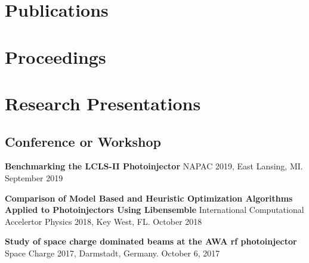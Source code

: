 \documentclass[11pt,a4paper,sans]{moderncv}        %
\begin{document}
\newpage
\section{Publications}
%






\section{Proceedings}


\section{Research Presentations}
\subsection{Conference or Workshop} %
\textbf{Benchmarking the LCLS-II Photoinjector}\newline
NAPAC 2019, East Lansing, MI. September 2019
\vspace{0.3em}

\textbf{Comparison of Model Based and Heuristic Optimization Algorithms \newline
	Applied to Photoinjectors Using Libensemble}\newline
International Computational Accelertor Physics 2018, Key West, FL. October 2018
\vspace{0.3em}

\textbf{Study of space charge dominated beams at the AWA rf photoinjector}\newline
Space Charge 2017, Darmstadt, Germany. October 6, 2017
\end{document}
